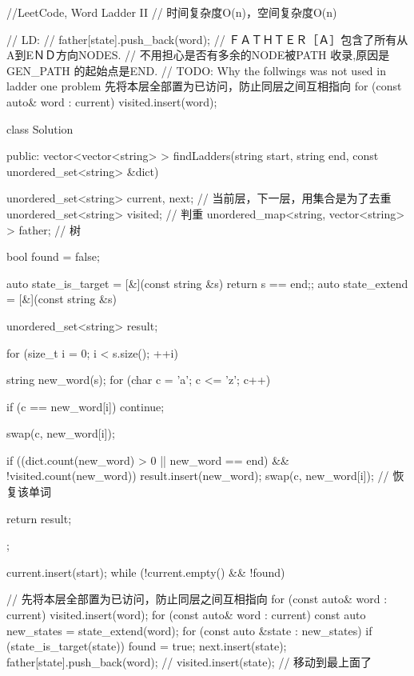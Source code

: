 \begin{Code}
//LeetCode, Word Ladder II
// 时间复杂度O(n)，空间复杂度O(n)


// LD:
// father[state].push_back(word);
// ＦＡＴＨＴＥＲ［Ａ］包含了所有从A到EＮＤ方向NODES.
// 不用担心是否有多余的NODE被PATH 收录,原因是GEN_PATH 的起始点是END.
// TODO: Why the follwings was not used in ladder one problem
          先将本层全部置为已访问，防止同层之间互相指向
          for (const auto& word : current)
                visited.insert(word);



class Solution {
public:
    vector<vector<string> > findLadders(string start, string end,
            const unordered_set<string> &dict) {
        unordered_set<string> current, next;  // 当前层，下一层，用集合是为了去重
        unordered_set<string> visited; // 判重
        unordered_map<string, vector<string> > father; // 树

        bool found = false;

        auto state_is_target = [&](const string &s) {return s == end;};
        auto state_extend = [&](const string &s) {
            unordered_set<string> result;

            for (size_t i = 0; i < s.size(); ++i) {
                string new_word(s);
                for (char c = 'a'; c <= 'z'; c++) {
                    if (c == new_word[i]) continue;

                    swap(c, new_word[i]);

                    if ((dict.count(new_word) > 0 || new_word == end) &&
                             !visited.count(new_word)) {
                        result.insert(new_word);
                    }
                    swap(c, new_word[i]); // 恢复该单词
                }
            }

            return result;
        };

        current.insert(start);
        while (!current.empty() && !found) {
            // 先将本层全部置为已访问，防止同层之间互相指向
            for (const auto& word : current)
                visited.insert(word);
            for (const auto& word : current) {
                const auto new_states = state_extend(word);
                for (const auto &state : new_states) {
                    if (state_is_target(state)) found = true;
                    next.insert(state);
                    father[state].push_back(word);
                    // visited.insert(state); // 移动到最上面了
                }
            }

}}}
\end{Code}
